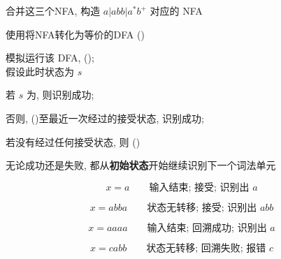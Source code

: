 \begin{frame}{}
  \begin{center}
    合并这三个NFA, 构造 $a | abb | a^{\ast}b^{+}$ 对应的 NFA
  \end{center}

\end{frame}

\begin{frame}{}
  \begin{center}
    使用将NFA转化为等价的DFA ()


    \vspace{0.30cm}
  \end{center}
\end{frame}

\begin{frame}{}
  \begin{center}
    模拟运行该 DFA,  (); \\[3pt]
    假设此时状态为 $s$


    \pause
    若 $s$ 为, 则识别成功;

    \vspace{0.30cm}
    否则,  ()至最近一次经过的接受状态, 识别成功;

    \vspace{0.30cm}
    若没有经过任何接受状态, 则 ()

    \vspace{0.30cm}
    无论成功还是失败, 都从{\bf 初始状态}开始继续识别下一个词法单元
  \end{center}
\end{frame}

\begin{frame}

  \[
    x = a \qquad \text{输入结束; 接受; 识别出 $a$}
  \]

  \pause
  \vspace{-0.40cm}
  \[
    x = abba \qquad \text{状态无转移; 接受; 识别出 $abb$}
  \]

  \pause
  \vspace{-0.40cm}
  \[
    x = aaaa \qquad \text{输入结束; 回溯成功; 识别出 $a$}
  \]

  \pause
  \vspace{-0.40cm}
  \[
    x = cabb \qquad \text{状态无转移; 回溯失败; 报错 $c$}
  \]
\end{frame}

